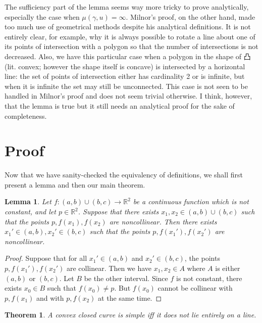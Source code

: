 \documentclass{amsart}
\newtheorem{lemma}[proposition]{Lemma}
\newtheorem{theorem}[proposition]{Theorem}
\theoremstyle{definition}
\begin{document}
The sufficiency part of the lemma seems way more tricky to prove
analytically, especially the case when $\mu(\gamma,u)=\infty$.
Milnor's proof, on the other hand, made too much use of
geometrical methods despite his analytical definitions.
It is not entirely clear, for example, why it is always possible
to rotate a line about one of its points of intersection with
a polygon so that the number of intersections is not decreased.
Also, we have this particular case when a polygon in the shape of 凸
(lit. convex; however the shape itself is concave)
is intersected by a horizontal line: the set of points of intersection
either has cardinality 2 or is infinite, but when it is infinite
the set may still be unconnected. This case is not seen to
be handled in Milnor's proof and does not seem trivial otherwise.
I think, however, that the lemma is true but it still needs
an analytical proof for the sake of completeness.

\section{Proof}

Now that we have sanity-checked the equivalency of definitions,
we shall first present a lemma and then our main theorem.

\begin{lemma}
    \label{lem}
    Let $f:(a,b)\cup(b,c)\to\mathbb{R}^2$ be a continuous function
    which is not constant, and let $p\in\mathbb{R}^2$.
    Suppose that there exists $x_1,x_2\in(a,b)\cup(b,c)$ such that
    the points $p,f(x_1),f(x_2)$ are noncollinear.
    Then there exists $x_1'\in(a,b),x_2'\in(b,c)$ such that
    the points $p,f(x_1'),f(x_2')$ are noncollinear.
\end{lemma}

\begin{proof}
    Suppose that for all $x_1'\in(a,b)$ and $x_2'\in(b,c)$,
    the points $p,f(x_1'),f(x_2')$ are collinear.
    Then we have $x_1,x_2\in A$ where
    $A$ is either $(a,b)$ or $(b,c)$. Let $B$ be the other interval.
    Since $f$ is not constant, there exists $x_0\in B$
    such that $f(x_0)\ne p$. But $f(x_0)$ cannot be collinear
    with $p,f(x_1)$ and with $p,f(x_2)$ at the same time.
\end{proof}

\begin{theorem}
    A convex closed curve is simple iff
    it does not lie entirely on a line.
\end{theorem}
\end{document}
